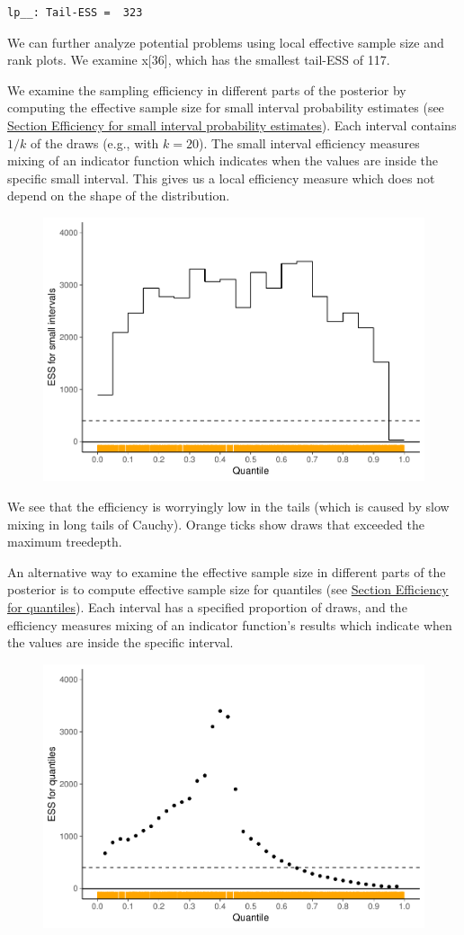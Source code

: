 \documentclass[american,]{article}
\begin{document}
\begin{verbatim}
lp__: Tail-ESS =  323
\end{verbatim}

We can further analyze potential problems using local effective sample
size and rank plots. We examine x{[}36{]}, which has the smallest
tail-ESS of 117.

We examine the sampling efficiency in different parts of the posterior
by computing the effective sample size for small interval probability
estimates (see \protect\hyperlink{small_interval_S_eff}{Section
Efficiency for small interval probability estimates}). Each interval
contains \(1/k\) of the draws (e.g., with \(k=20\)). The small interval
efficiency measures mixing of an indicator function which indicates when
the values are inside the specific small interval. This gives us a local
efficiency measure which does not depend on the shape of the
distribution.

\begin{figure}[t]
  \centering
  \includegraphics[width=0.6\linewidth]{graphics/local-ess-fit-nom-2-1.pdf}
\end{figure}

We see that the efficiency is worryingly low in the tails (which is
caused by slow mixing in long tails of Cauchy). Orange ticks show draws
that exceeded the maximum treedepth.

An alternative way to examine the effective sample size in different
parts of the posterior is to compute effective sample size for quantiles
(see \protect\hyperlink{quantile_S_eff}{Section Efficiency for
quantiles}). Each interval has a specified proportion of draws, and the
efficiency measures mixing of an indicator function's results which
indicate when the values are inside the specific interval.

\begin{figure}[t]
  \centering
  \includegraphics[width=0.6\linewidth]{graphics/quantile-ess-fit-nom-2-1.pdf}
\end{figure}
\end{document}
